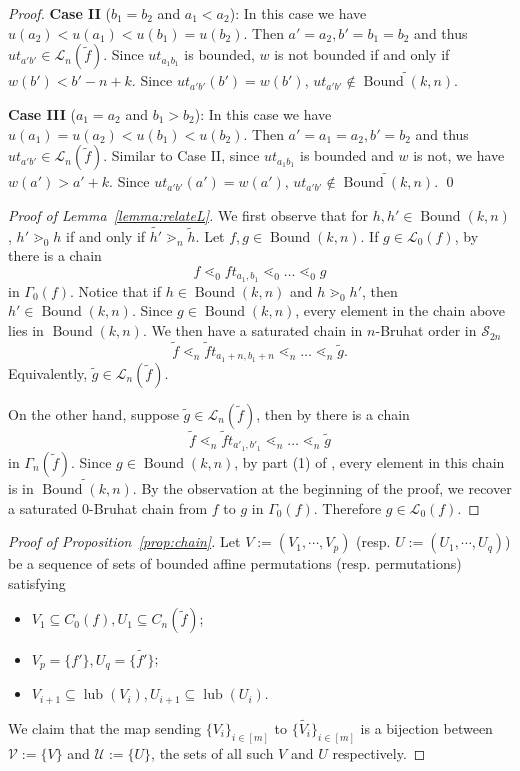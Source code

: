 \documentclass[12pt,reqno]{amsart}
\theoremstyle{definition}
\newcommand{\symm}{\mathcal{S}}
\newcommand{\bound}{\operatorname{Bound}}
\newcommand{\lub}{\operatorname{lub}}
\newcommand{\Lenart}{\mathcal{L}}
\begin{document}
{\begin{proof}
        \medskip
        \noindent \textbf{Case II} ($b_1 = b_2$ and $a_1<a_2$): In this case we have $u(a_2)<u(a_1)<u(b_1) = u(b_2)$. Then $a' = a_2,b' = b_1 = b_2$ and thus $ut_{a'b'}\in \Lenart_n(\widetilde{f})$. Since $ut_{a_1b_1}$ is bounded, $w$ is not bounded if and only if $w(b')< b'-n+k$. Since $ut_{a'b'}(b') = w(b')$, $ut_{a'b'}\notin \widetilde{\bound(k,n)}$.

        \medskip
        \noindent \textbf{Case III} ($a_1 = a_2$ and $b_1>b_2$): In this case we have $u(a_1) = u(a_2)< u(b_1)< u(b_2)$. Then $a' = a_1 = a_2, b' = b_2$ and thus $ut_{a'b'}\in \Lenart_n(\widetilde{f})$. Similar to Case II, since $ut_{a_1b_1}$ is bounded and $w$ is not, we have $w(a')> a'+k$. Since $ut_{a'b'}(a') = w(a')$, $ut_{a'b'}\notin \widetilde{\bound(k,n)}$.
\qed

\end{proof}

\begin{proof}[Proof of Lemma~\ref{lemma:relateL}]
We first observe that for $h,h'\in \bound(k,n)$, $h'\gtrdot_0 h$ if and only if $\widetilde{h'}\gtrdot_n \widetilde{h}$.
Let $f,g\in \bound(k,n)$. If $g\in \Lenart_0(f)$,  by  there is a  chain 
\[f\lessdot_0 ft_{a_1,b_1} \lessdot_0 \dots \lessdot_0 g\]
in $\Gamma_0(f)$.
Notice that if $h\in \bound(k,n)$ and $h\gtrdot_0 h'$, then $h'\in \bound(k,n)$. Since $g\in \bound(k,n)$, every element in the chain above lies in $\bound(k,n)$. 
We then have a saturated chain in $n$-Bruhat order in $\symm_{2n}$
\[\widetilde{f}\lessdot_n \widetilde{f}t_{a_1+n,b_1+n}\lessdot_n \dots \lessdot_n \widetilde{g}. \]
Equivalently, $\widetilde{g}\in \Lenart_n(\widetilde{f})$. 

    On the other hand, suppose $\widetilde{g}\in \Lenart_{n}(\widetilde{f})$, then by  there is a chain 
    \[\widetilde{f}\lessdot_n \widetilde{f}t_{a'_1,b'_1}\lessdot_n \dots \lessdot_n \widetilde{g} \]
    in $\Gamma_n(\widetilde{f})$. 
    Since $g\in \bound(k,n)$, by part (1) of , every element in this chain is in $\widetilde{\bound(k,n)}$. By the  observation at the beginning of the proof, we recover a saturated $0$-Bruhat chain from $f$ to $g$ in $\Gamma_0(f)$. Therefore $g\in \Lenart_0(f)$.
\end{proof}




\begin{proof}[Proof of Proposition~\ref{prop:chain}] Let $V:=(V_1,\cdots, V_p)$ (resp. $U:=(U_1,\cdots,U_{q})$) be a sequence of sets of bounded affine permutations (resp. permutations) satisfying 
    \begin{itemize}
        \item $V_1\subseteq C_0(f),U_1\subseteq C_n(\widetilde{f})$;
        \item $V_{p} = \{f'\}, U_{q} = \{\widetilde{f'}\}$;
        \item $V_{i+1}\subseteq \lub(V_{i}),U_{i+1}\subseteq \lub(U_{i})$.
    \end{itemize}
We claim that the map sending $\{V_i\}_{i\in [m]}$ to $\{\widetilde{V_i}\}_{i\in [m]}$ is a bijection between $\mathcal{V}:=\{V\}$ and $\mathcal{U}:=\{U\}$, the sets of all such $V$ and $U$ respectively.



\end{proof}}
\end{document}
